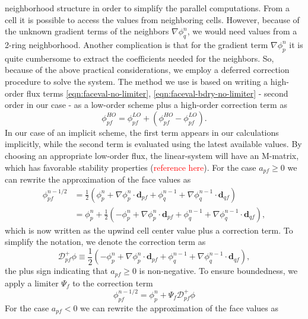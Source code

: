 \documentclass[../thesis.tex]{subfiles}
\begin{document}
neighborhood structure in order to simplify the parallel computations. From a
cell it is possible to access the values from neighboring cells. However,
because of the unknown gradient terms of the neighbors \(\nabla\phi_q^{n}\),
we would need values from a 2-ring neighborhood. Another complication is that
for the gradient term \(\nabla\phi_p^n\) it is quite cumbersome to extract
the coefficients needed for the neighbors. So, because of the above practical
considerations, we employ a deferred correction procedure
\cite{1974_Khosla,2016_Moukalled_BOOK,2019_Hahn} to solve the system.
The method we use is based on writing a high-order flux terms
\eqref{eqn:faceval-no-limiter}, \eqref{eqn:faceval-bdry-no-limiter} - second order
in our case - as a low-order scheme plus a high-order correction term as
\begin{equation}
	\phi_{pf}^{HO} = \phi_{pf}^{LO} + (\phi_{pf}^{HO} - \phi_{pf}^{LO}).
\end{equation}
In our case of an implicit scheme, the first term appears in our calculations
implicitly, while the second term is evaluated using the latest available values.
By choosing an appropriate low-order flux, the linear-system will have an
M-matrix, which has favorable stability properties (\textcolor{red}{reference here}).
For the case $ a_{pf} \geq 0 $ we can rewrite the approximation of the face values as
\begin{equation}
	\begin{split}
		\phi_{pf}^{n-1/2}
		&= \frac{1}{2}(\phi_p^n + \nabla\phi_p^n\cdot\mathbf{d}_{pf} +
		\phi_q^{n-1} + \nabla\phi_q^{n-1}\cdot\mathbf{d}_{qf}) \\
		&= \phi_p^n + \frac{1}{2}(-\phi_p^n + \nabla\phi_p^n\cdot\mathbf{d}_{pf} +
		\phi_q^{n-1} + \nabla\phi_q^{n-1}\cdot\mathbf{d}_{qf}),
	\end{split}
\end{equation}
which is now written as the upwind cell center value plus a correction term.
To simplify the notation, we denote the correction term as
\[
	\mathcal{D}^+_{pf}\phi
	\equiv
	\frac{1}{2}(-\phi_p^n + \nabla\phi_p^n\cdot\mathbf{d}_{pf} +
	\phi_q^{n-1} + \nabla\phi_q^{n-1}\cdot\mathbf{d}_{qf}),
\]
the plus sign indicating that $ a_{pf} \geq 0 $ is non-negative.
To ensure boundedness, we apply a limiter $ \Psi_{f} $ to the correction term
\begin{equation} \label{rec_face}
	\phi_{pf}^{n-1/2} = \phi_p^n + \Psi_{f} \mathcal{D}^+_{pf}\phi
\end{equation}
For the case $ a_{pf} < 0 $ we can rewrite the approximation of the face values as
\end{document}
